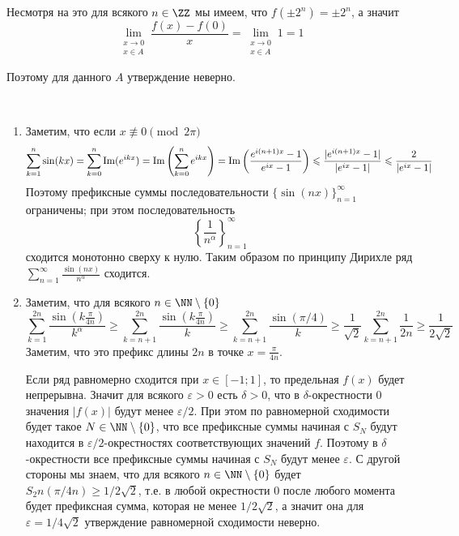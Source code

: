 \documentclass[12pt,a4paper]{article}
\renewcommand{\Im}{\qopname\relax o{Im}}
\begin{document}
\begin{enumproblem}
\begin{enumerate}
            Несмотря на это для всякого $n \in \ZZ$ мы имеем, что $f(\pm 2^n) = \pm 2^n$, а значит
            \[\lim_{\substack{x \to 0\\x\in A}} \frac{f(x) - f(0)}{x} = \lim_{\substack{x \to 0\\x\in A}} 1 = 1\]

            Поэтому для данного $A$ утверждение неверно.
        \end{enumerate}
    \end{enumproblem}

    \begin{enumproblem}\ 
        \begin{enumerate}
            \item Заметим, что если $x \not\equiv 0 \pmod{2\pi}$
            \begin{gather*}
                \sum_{k = 1}^n \sin(kx) = \sum_{k = 0}^n \Im(e^{ikx}) = \Im\left(\sum_{k = 0}^n e^{ikx}\right) = \Im\left(\frac{e^{i(n+1)x} - 1}{e^{ix} - 1}\right) \leqslant \frac{|e^{i(n+1)x} - 1|}{|e^{ix} - 1|} \leqslant \frac{2}{|e^{ix} - 1|}
            \end{gather*}
            Поэтому префиксные суммы последовательности $\{\sin(nx)\}_{n=1}^\infty$ ограничены; при этом последовательность
            \[\left\{\frac{1}{n^\alpha}\right\}_{n=1}^\infty\]
            сходится монотонно сверху к нулю. Таким образом по принципу Дирихле ряд $\sum_{n=1}^\infty \frac{\sin(nx)}{n^\alpha}$ сходится.

            \item Заметим, что для всякого $n \in \NN \setminus \{0\}$
            \[\sum_{k=1}^{2n} \frac{\sin(k \frac{\pi}{4n})}{k^\alpha} \geqslant \sum_{k=n+1}^{2n} \frac{\sin(k \frac{\pi}{4n})}{k} \geqslant \sum_{k=n+1}^{2n} \frac{\sin(\pi/4)}{k} \geqslant \frac{1}{\sqrt{2}} \sum_{k=n+1}^{2n} \frac{1}{2n} \geqslant \frac{1}{2\sqrt{2}}\]
            Заметим, что это префикс длины $2n$ в точке $x = \frac{\pi}{4n}$.

            Если ряд равномерно сходится при $x \in [-1; 1]$, то предельная $f(x)$ будет непрерывна. Значит для всякого $\varepsilon > 0$ есть $\delta > 0$, что в $\delta$-окрестности $0$ значения $|f(x)|$ будут менее $\varepsilon/2$. При этом по равномерной сходимости будет такое $N \in \NN \setminus \{0\}$, что все префиксные суммы начиная с $S_N$ будут находится в $\varepsilon/2$-окрестностях соответствующих значений $f$. Поэтому в $\delta$-окрестности все префиксные суммы начиная с $S_N$ будут менее $\varepsilon$. С другой стороны мы знаем, что для всякого $n \in \NN \setminus \{0\}$ будет $S_2n(\pi/4n) \geqslant 1/2\sqrt{2}$, т.е. в любой окрестности $0$ после любого момента будет префиксная сумма, которая не менее $1/2\sqrt{2}$, а значит она для $\varepsilon = 1/4\sqrt{2}$ утверждение равномерной сходимости неверно.


\end{enumerate}
\end{enumproblem}
\end{document}
